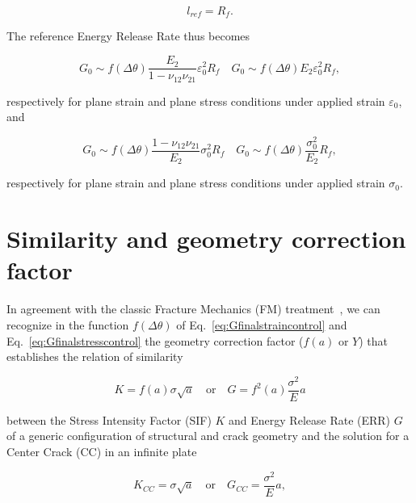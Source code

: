 \documentclass[review]{elsarticle}
\begin{document}
\begin{equation}\label{eq:lref}
l_{ref}=R_{f}.
\end{equation}

The reference Energy Release Rate thus becomes

\begin{equation}\label{eq:Gfinalstraincontrol}
G_{0}\sim f\left(\Delta\theta\right)\frac{E_{2}}{1-\nu_{12}\nu_{21}}\varepsilon_{0}^{2}R_{f}\quad G_{0}\sim f\left(\Delta\theta\right)E_{2}\varepsilon_{0}^{2}R_{f},
\end{equation}

respectively for plane strain and plane stress conditions under applied strain $\varepsilon_{0}$, and

\begin{equation}\label{eq:Gfinalstresscontrol}
G_{0}\sim f\left(\Delta\theta\right)\frac{1-\nu_{12}\nu_{21}}{E_{2}}\sigma_{0}^{2}R_{f}\quad G_{0}\sim f\left(\Delta\theta\right)\frac{\sigma_{0}^{2}}{E_{2}}R_{f},
\end{equation}

respectively for plane strain and plane stress conditions under applied strain $\sigma_{0}$.

\section{Similarity and geometry correction factor}

In agreement with the classic Fracture Mechanics (FM) treatment~\cite{Tada2000}, we can recognize in the function $f\left(\Delta\theta\right)$ of Eq.~\ref{eq:Gfinalstraincontrol} and Eq.~\ref{eq:Gfinalstresscontrol} the geometry correction factor ($f\left(a\right)$ or $Y$) that establishes the relation of similarity~\cite{Barenblatt2006}

\begin{equation}\label{eq:Gsim}
K=f\left(a\right)\sigma\sqrt{a}\quad\text{or}\quad G=f^{2}\left(a\right)\frac{\sigma^{2}}{E}a
\end{equation}

between the Stress Intensity Factor (SIF) $K$ and Energy Release Rate (ERR) $G$ of a generic configuration of structural and crack geometry and the solution for a Center Crack (CC) in an infinite plate

\begin{equation}\label{eq:Gsim}
K_{CC}=\sigma\sqrt{a}\quad\text{or}\quad G_{CC}=\frac{\sigma^{2}}{E}a,
\end{equation}
\end{document}
